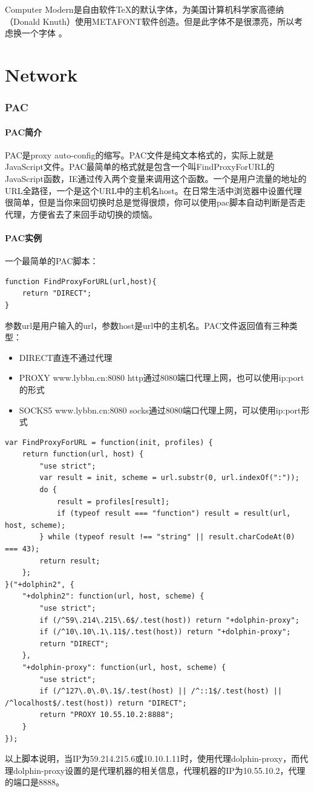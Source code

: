 \documentclass[letter]{book}
\begin{document}
Computer Modern是自由软件TeX的默认字体，为美国计算机科学家高德纳（Donald Knuth）使用METAFONT软件创造。但是此字体不是很漂亮，所以考虑换一个字体 。


\part{Network}

\section{PAC}

\subsection{PAC简介}

PAC是proxy auto-config的缩写。PAC文件是纯文本格式的，实际上就是JavaScript文件。PAC最简单的格式就是包含一个叫FindProxyForURL的JavaScript函数，IE通过传入两个变量来调用这个函数。一个是用户流量的地址的URL全路径，一个是这个URL中的主机名host。在日常生活中浏览器中设置代理很简单，但是当你来回切换时总是觉得很烦，你可以使用pac脚本自动判断是否走代理，方便省去了来回手动切换的烦恼。

\subsection{PAC实例}

一个最简单的PAC脚本：

\begin{lstlisting}[language=VBScript]
function FindProxyForURL(url,host){
	return "DIRECT";
}
\end{lstlisting}

参数url是用户输入的url，参数host是url中的主机名。PAC文件返回值有三种类型：

\begin{itemize}
	\item{DIRECT直连不通过代理}
	\item{PROXY www.lybbn.cn:8080 http通过8080端口代理上网，也可以使用ip:port的形式}
	\item{SOCKS5 www.lybbn.cn:8080 socks通过8080端口代理上网，可以使用ip:port形式}
\end{itemize}

\begin{lstlisting}[language=VBScript]
var FindProxyForURL = function(init, profiles) {
	return function(url, host) {
		"use strict";
		var result = init, scheme = url.substr(0, url.indexOf(":"));
		do {
			result = profiles[result];
			if (typeof result === "function") result = result(url, host, scheme);
		} while (typeof result !== "string" || result.charCodeAt(0) === 43);
		return result;
	};
}("+dolphin2", {
	"+dolphin2": function(url, host, scheme) {
		"use strict";
		if (/^59\.214\.215\.6$/.test(host)) return "+dolphin-proxy";
		if (/^10\.10\.1\.11$/.test(host)) return "+dolphin-proxy";
		return "DIRECT";
	},
	"+dolphin-proxy": function(url, host, scheme) {
		"use strict";
		if (/^127\.0\.0\.1$/.test(host) || /^::1$/.test(host) || /^localhost$/.test(host)) return "DIRECT";
		return "PROXY 10.55.10.2:8888";
	}
});
\end{lstlisting}

以上脚本说明，当IP为59.214.215.6或10.10.1.11时，使用代理dolphin-proxy，而代理dolphin-proxy设置的是代理机器的相关信息，代理机器的IP为10.55.10.2，代理的端口是8888。
\end{document}
